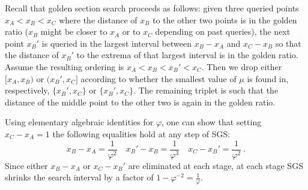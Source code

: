 Recall that golden section search proceeds as follows: given three queried points $x_A < x_B < x_C$ where the distance of $x_B$ to the other two points is in the golden ratio ($x_B$ might be closer to $x_A$ or to $x_C$ depending on past queries), the next point $x_B'$ is queried in the largest interval between $x_B-x_A$ and $x_C-x_B$ so that the distance of $x_B'$ to the extrema of that largest interval is in the golden ratio. Assume the resulting ordering is $x_A < x_B < x_B' < x_C$. Then we drop either $[x_A,x_B)$ or $(x_B',x_C]$ according to whether the smallest value of $\mu$ is found in, respectively, $\{x_B',x_C\}$ or $\{x_B',x_C\}$. The remaining triplet is such that the distance of the middle point to the other two is again in the golden ratio.

Using elementary algebraic identities for $\varphi$, one can show that setting $x_C-x_A = 1$ the following equalities hold at any step of SGS:
\begin{equation}
\label{eq:sgs-ratios}
    x_B-x_A = \frac{1}{\varphi^2} \quad x_B'-x_B = \frac{1}{\varphi^3} \quad x_C - x_B' = \frac{1}{\varphi^2}~.
\end{equation}
Since either $x_B-x_A$ or $x_C - x_B'$ are eliminated at each stage, at each stage SGS shrinks the search interval by a factor of $1 - \varphi^{-2} = \tfrac{1}{\varphi}$.

